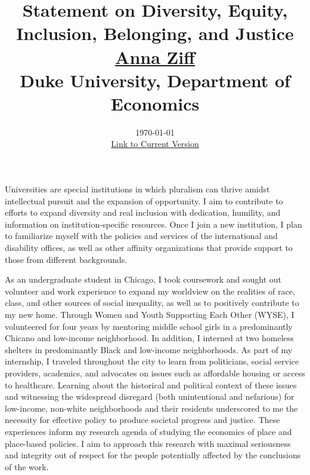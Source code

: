 


\setlength{\parskip}{\baselineskip}%
\setlength{\parindent}{0pt}%
\setlength{\droptitle}{-5em}

\title{\normalsize \textbf{Statement on Diversity, Equity, Inclusion, Belonging, and Justice} \\ \href{https://aziff.github.io}{Anna Ziff} \\ Duke University, Department of Economics}
\date{\vspace{-2.25cm} \normalsize \today \\ \href{https://www.dropbox.com/scl/fi/vt1wcqmt9b7r1oouowp91/AnnaZiff_DiversityStatement.pdf?rlkey=w8rojl4nlqylzhvie7lxkfsf0&dl=0}{Link to Current Version}}
\maketitle

Universities are special institutions in which pluralism can thrive amidst intellectual pursuit and the expansion of opportunity. I aim to contribute to efforts to expand diversity and real inclusion with dedication, humility, and information on institution-specific resources. Once I join a new institution, I plan to familiarize myself with the policies and services of the international and disability offices, as well as other affinity organizations that provide support to those from different backgrounds. 

As an undergraduate student in Chicago, I took coursework and sought out volunteer and work experience to expand my worldview on the realities of race, class, and other sources of social inequality, as well as to positively contribute to my new home. Through Women and Youth Supporting Each Other (WYSE), I volunteered for four years by mentoring middle school girls in a predominantly Chicano and low-income neighborhood. In addition, I interned at two homeless shelters in predominantly Black and low-income neighborhoods. As part of my internship, I traveled throughout the city to learn from politicians, social service providers, academics, and advocates on issues such as affordable housing or access to healthcare. Learning about the historical and political context of these issues and witnessing the widespread disregard (both unintentional and nefarious) for low-income, non-white neighborhoods and their residents underscored to me the necessity for effective policy to produce societal progress and justice. These experiences inform my research agenda of studying the economics of place and place-based policies. I aim to approach this research with maximal seriousness and integrity out of respect for the people potentially affected by the conclusions of the work.


